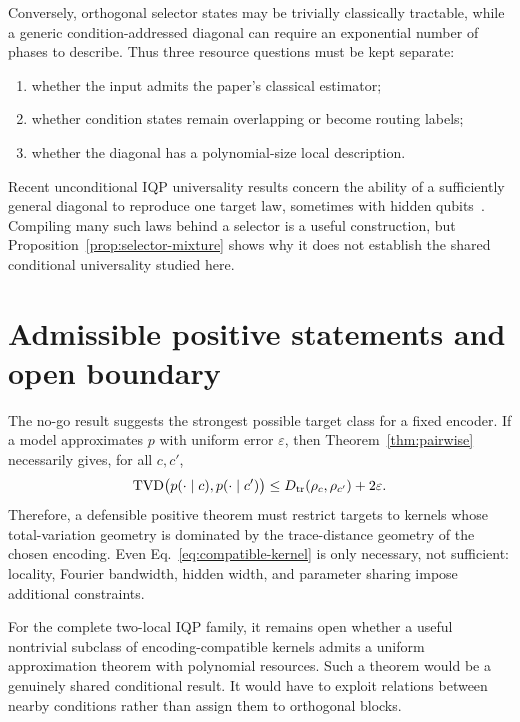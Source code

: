 \documentclass[11pt]{article}
\theoremstyle{definition}
\theoremstyle{remark}
\newcommand{\TVD}{\operatorname{TVD}}
\begin{document}
Conversely, orthogonal selector states may be trivially classically
tractable, while a generic condition-addressed diagonal can require an
exponential number of phases to describe.  Thus three resource questions must
be kept separate:
\begin{enumerate}
  \item whether the input admits the paper's classical estimator;
  \item whether condition states remain overlapping or become routing labels;
  \item whether the diagonal has a polynomial-size local description.
\end{enumerate}

Recent unconditional IQP universality results concern the ability of a
sufficiently general diagonal to reproduce one target law, sometimes with
hidden qubits~\citep{kurkinUniversalityKernelAdaptive2025}.  Compiling many
such laws behind a selector is a useful construction, but
Proposition~\ref{prop:selector-mixture} shows why it does not establish the
shared conditional universality studied here.

\section{Admissible positive statements and open boundary}
\label{sec:boundary}

The no-go result suggests the strongest possible target class for a fixed
encoder.  If a model approximates $p$ with uniform error $\varepsilon$, then
Theorem~\ref{thm:pairwise} necessarily gives, for all $c,c'$,
\begin{equation}
 \TVD\bigl(p(\cdot\mid c),p(\cdot\mid c')\bigr)
 \leq D_{\rm tr}(\rho_c,\rho_{c'})+2\varepsilon.
 \label{eq:compatible-kernel}
\end{equation}
Therefore, a defensible positive theorem must restrict targets to kernels
whose total-variation geometry is dominated by the trace-distance geometry of
the chosen encoding.  Even Eq.~\eqref{eq:compatible-kernel} is only necessary,
not sufficient: locality, Fourier bandwidth, hidden width, and parameter
sharing impose additional constraints.

For the complete two-local IQP family, it remains open whether a useful
nontrivial subclass of encoding-compatible kernels admits a uniform
approximation theorem with polynomial resources.  Such a theorem would be a
genuinely shared conditional result.  It would have to exploit relations
between nearby conditions rather than assign them to orthogonal blocks.
\end{document}
